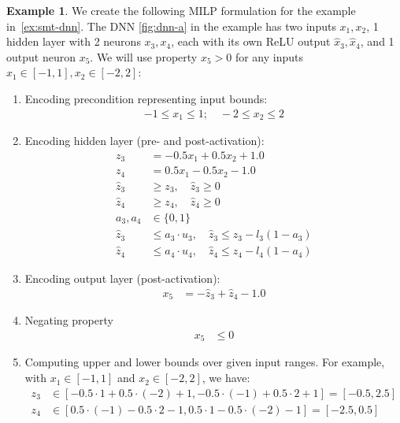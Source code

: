 \documentclass[oneside,11pt,dvipsnames]{book}
\numberwithin{equation}{section}
\theoremstyle{definition}
\newtheorem{example}{Example}[section]
\theoremstyle{remark}
\begin{document}
\begin{example}\label{ex:milp-dnn}
    We create the following MILP formulation for the example in~\autoref{ex:smt-dnn}. The DNN \autoref{fig:dnn-a} in the example has two inputs $x_1, x_2$, 1 hidden layer with 2 neurons $x_3, x_4$, each with its own ReLU output $\hat{x}_3, \hat{x}_4$, and 1 output neuron $x_5$.
    We will use property $x_5 > 0$ for any inputs $x_1 \in [-1,1], x_2\in[-2,2]$:



\begin{enumerate}    
\item Encoding precondition representing input bounds:
\begin{align*}
-1 \le x_1 \le 1;\quad -2 \le x_2 \le 2
\end{align*}

\item Encoding hidden layer (pre- and post-activation): 
\begin{align*}
z_3 &= -0.5x_1 + 0.5x_2 + 1.0 \\
z_4 &= 0.5x_1 - 0.5x_2 - 1.0 \\
\hat{z}_3 &\ge z_3, \quad \hat{z}_3 \ge 0 \\
\hat{z}_4 &\ge z_4, \quad \hat{z}_4 \ge 0 \\
a_3, a_4 &\in \{0, 1\} \\
\hat{z}_3 &\le a_3 \cdot u_3, \quad \hat{z}_3 \le z_3 - l_3(1 - a_3) \\
\hat{z}_4 &\le a_4 \cdot u_4, \quad \hat{z}_4 \le z_4 - l_4(1 - a_4)
\end{align*}


\item Encoding output layer (post-activation):
\begin{align*}
x_5 &= -\hat{z}_3 + \hat{z}_4 - 1.0
\end{align*}

\item Negating property
\begin{align*}
x_5 &\le 0
\end{align*}

\item Computing upper and lower bounds over given input ranges. For example, with $x_1 \in [-1,1]$ and $x_2 \in [-2,2]$, we have: 
\begin{align*}
z_3 &\in [-0.5 \cdot 1 + 0.5 \cdot (-2) + 1, -0.5 \cdot (-1) + 0.5 \cdot 2 + 1] = [-0.5, 2.5] \\
z_4 &\in [0.5 \cdot (-1) - 0.5 \cdot 2 - 1, 0.5 \cdot 1 - 0.5 \cdot (-2) - 1] = [-2.5, 0.5]
\end{align*}


\end{enumerate}
\end{example}
\end{document}

